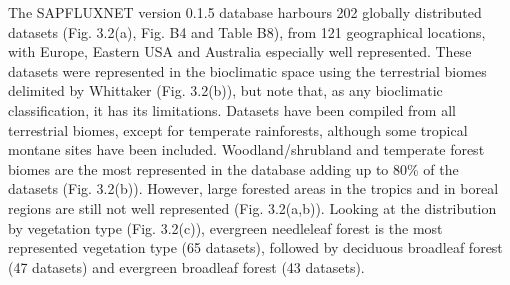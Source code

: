 \documentclass[11pt,twoside]{reedthesis}
\begin{document}
The SAPFLUXNET version 0.1.5 database harbours 202 globally distributed
datasets (Fig. 3.2(a), Fig. B4 and Table B8), from 121 geographical
locations, with Europe, Eastern USA and Australia especially well
represented. These datasets were represented in the bioclimatic space
using the terrestrial biomes delimited by Whittaker (Fig. 3.2(b)), but
note that, as any bioclimatic classification, it has its limitations.
Datasets have been compiled from all terrestrial biomes, except for
temperate rainforests, although some tropical montane sites have been
included. Woodland/shrubland and temperate forest biomes are the most
represented in the database adding up to 80\% of the datasets (Fig.
3.2(b)). However, large forested areas in the tropics and in boreal
regions are still not well represented (Fig. 3.2(a,b)). Looking at the
distribution by vegetation type (Fig. 3.2(c)), evergreen needleleaf
forest is the most represented vegetation type (65 datasets), followed
by deciduous broadleaf forest (47 datasets) and evergreen broadleaf
forest (43 datasets).\par
\end{document}

